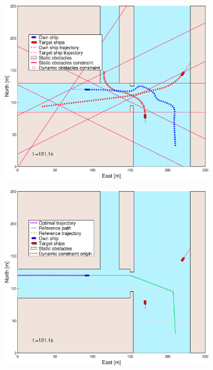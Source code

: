 \begin{figure}[ht]
\begin{subfigure}[b]{0.494\textwidth}
        \subcaption{}
    \end{subfigure}
    \hfill
    \\
    \begin{subfigure}[b]{0.494\textwidth}
        \centering
        \includegraphics[width=\textwidth]{Images/Figures/Havn1/_Simple_1fig1_time=101}
        \subcaption{}
    \end{subfigure}
    \hfill
    \begin{subfigure}[b]{0.494\textwidth}
        \centering
        \includegraphics[width=\textwidth]{Images/Figures/Havn1/_Simple_1fig999_time=101}

\end{subfigure}
\end{figure}

